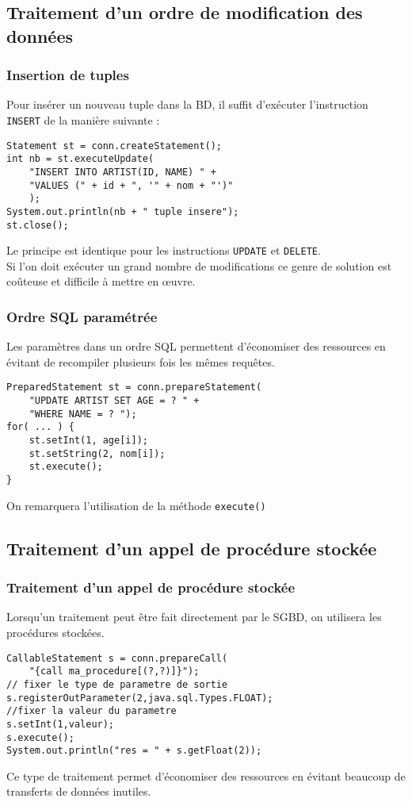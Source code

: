 \documentclass[xcolor=pdftex,x11names,table]{beamer}
\begin{document}
		\subsection{Traitement d’un ordre de modification des données}
		\begin{frame}[fragile]
    \frametitle{Insertion de tuples}
      Pour insérer un nouveau tuple dans la BD, il suffit d'exécuter l'instruction \texttt{INSERT} de la manière suivante :
      \pause
      \begin{block}{}
    	  \begin{lstlisting}
Statement st = conn.createStatement();
int nb = st.executeUpdate(
    "INSERT INTO ARTIST(ID, NAME) " +
    "VALUES (" + id + ", '" + nom + "')"
    );
System.out.println(nb + " tuple insere");
st.close();
			  \end{lstlisting}
			\end{block}
			Le principe est identique pour les instructions \texttt{UPDATE} et \texttt{DELETE}.\\
			Si l'on doit exécuter un grand nombre de modifications ce genre de solution est coûteuse 
			et difficile à mettre en œuvre.		
		\end{frame}

		\begin{frame}[fragile]
    \frametitle{Ordre SQL paramétrée}
      Les paramètres dans un ordre SQL permettent d'économiser des ressources en évitant de recompiler 
      plusieurs fois les mêmes requêtes.
      \pause
      \begin{block}{}
    	  \begin{lstlisting}
PreparedStatement st = conn.prepareStatement(
    "UPDATE ARTIST SET AGE = ? " +
    "WHERE NAME = ? ");
for( ... ) {
    st.setInt(1, age[i]);
    st.setString(2, nom[i]);
    st.execute();
}       
        \end{lstlisting}
			\end{block}
			On remarquera l'utilisation de la méthode \lstinline$execute()$
		\end{frame}
		
		
		\subsection{Traitement d’un appel de procédure stockée}
		\begin{frame}[fragile]
    \frametitle{Traitement d’un appel de procédure stockée}
      Lorsqu'un traitement peut être fait directement par le SGBD, on utilisera les procédures stockées.\pause  
      \begin{block}{}
    	  \begin{lstlisting}
CallableStatement s = conn.prepareCall(
    "{call ma_procedure[(?,?)]}");
// fixer le type de parametre de sortie
s.registerOutParameter(2,java.sql.Types.FLOAT);
//fixer la valeur du parametre
s.setInt(1,valeur);
s.execute();
System.out.println("res = " + s.getFloat(2));
        \end{lstlisting}
			\end{block}
			Ce type de traitement permet d'économiser des ressources en évitant beaucoup de transferts de données inutiles.
		\end{frame}
		
\end{document}
